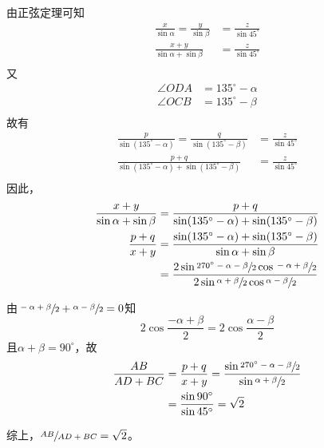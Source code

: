 由正弦定理可知
\begin{align*}
  \frac x{\sin\alpha} = \frac y{\sin\beta} &= \frac z{\sin45^\circ} \\
  \frac{x + y}{\sin\alpha + \sin\beta} &= \frac z{\sin45^\circ} \\
\end{align*}
又
\begin{align*}
  \angle ODA &= 135^\circ - \alpha \\
  \angle OCB &= 135^\circ - \beta \\
\end{align*}
故有
\begin{align*}
  \frac p{\sin(135^\circ - \alpha)} = \frac q{\sin(135^\circ - \beta)} &= \frac z{\sin45^\circ} \\
  \frac{p + q}{\sin(135^\circ - \alpha) + \sin(135^\circ - \beta)} &= \frac z{\sin45^\circ} \\
\end{align*}
因此，
\begin{align*}
  \frac{x + y}{\sin\alpha + \sin\beta} &= \frac{p + q}{\sin(135^\circ - \alpha) + \sin(135^\circ - \beta)} \\
  \frac{p + q}{x + y} &= \frac{\sin(135^\circ - \alpha) + \sin(135^\circ - \beta)}{\sin\alpha + \sin\beta} \\
  &= \frac{2\sin\sfrac{270^\circ - \alpha - \beta}2\cos\sfrac{-\alpha + \beta}2}{2\sin\sfrac{\alpha + \beta}2\cos\sfrac{\alpha - \beta}2} \\
\end{align*}

由$\sfrac{-\alpha + \beta}2 + \sfrac{\alpha - \beta}2 = 0$知
\[ 2\cos\frac{-\alpha + \beta}2 = 2\cos\frac{\alpha - \beta}2 \]
且$\alpha + \beta = 90^\circ$，故
\begin{align*}
  \frac{AB}{AD + BC} &= \frac{p + q}{x + y} = \frac{\sin\sfrac{270^\circ - \alpha - \beta}2}{\sin\sfrac{\alpha + \beta}2} \\
  &= \frac{\sin90^\circ}{\sin45^\circ} = \sqrt2 \\
\end{align*}

综上，$\sfrac{AB}{AD + BC} = \sqrt2$。
